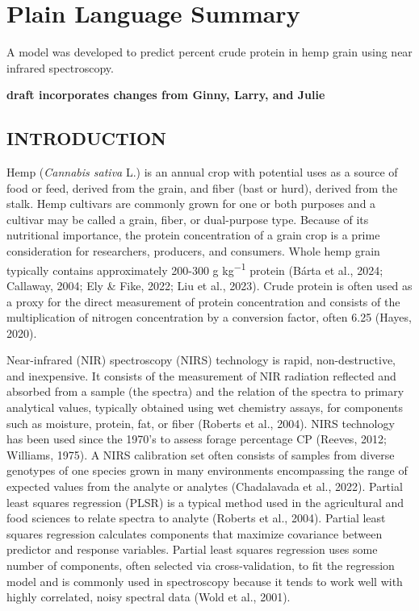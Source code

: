 \documentclass[
]{agujournal2019}
\begin{document}
\section*{Plain Language Summary}
A model was developed to predict percent crude protein in hemp grain
using near infrared spectroscopy.




\textbf{draft incorporates changes from Ginny, Larry, and Julie}

\subsection{INTRODUCTION}\label{introduction}

Hemp (\emph{Cannabis sativa} L.) is an annual crop with potential uses
as a source of food or feed, derived from the grain, and fiber (bast or
hurd), derived from the stalk. Hemp cultivars are commonly grown for one
or both purposes and a cultivar may be called a grain, fiber, or
dual-purpose type. Because of its nutritional importance, the protein
concentration of a grain crop is a prime consideration for researchers,
producers, and consumers. Whole hemp grain typically contains
approximately 200-300 g kg\textsuperscript{−1} protein (Bárta et al.,
2024; Callaway, 2004; Ely \& Fike, 2022; Liu et al., 2023). Crude
protein is often used as a proxy for the direct measurement of protein
concentration and consists of the multiplication of nitrogen
concentration by a conversion factor, often 6.25 (Hayes, 2020).

Near-infrared (NIR) spectroscopy (NIRS) technology is rapid,
non-destructive, and inexpensive. It consists of the measurement of NIR
radiation reflected and absorbed from a sample (the spectra) and the
relation of the spectra to primary analytical values, typically obtained
using wet chemistry assays, for components such as moisture, protein,
fat, or fiber (Roberts et al., 2004). NIRS technology has been used
since the 1970's to assess forage percentage CP (Reeves, 2012; Williams,
1975). A NIRS calibration set often consists of samples from diverse
genotypes of one species grown in many environments encompassing the
range of expected values from the analyte or analytes (Chadalavada et
al., 2022). Partial least squares regression (PLSR) is a typical method
used in the agricultural and food sciences to relate spectra to analyte
(Roberts et al., 2004). Partial least squares regression calculates
components that maximize covariance between predictor and response
variables. Partial least squares regression uses some number of
components, often selected via cross-validation, to fit the regression
model and is commonly used in spectroscopy because it tends to work well
with highly correlated, noisy spectral data (Wold et al., 2001).
\end{document}
